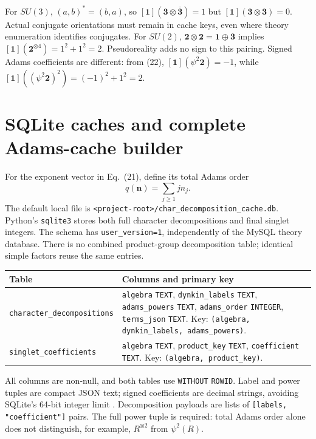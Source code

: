 \documentclass[11pt,a4paper]{article}
\newcommand{\code}[1]{{\small\nolinkurl{#1}}}
\begin{document}
For $SU(3)$, $(a,b)^*=(b,a)$, so
$[\mathbf1](\mathbf3\otimes\overline{\mathbf3})=1$ but
$[\mathbf1](\mathbf3\otimes\mathbf3)=0$. Actual conjugate orientations must remain
in cache keys, even where theory enumeration identifies conjugates.
For $SU(2)$, $\mathbf2\otimes\mathbf2=\mathbf1\oplus\mathbf3$ implies
$[\mathbf1](\mathbf2^{\otimes4})=1^2+1^2=2$. Pseudoreality adds no sign to this
pairing. Signed Adams coefficients are different: from (22),
$[\mathbf1](\psi^2\mathbf2)=-1$, while
$[\mathbf1]((\psi^2\mathbf2)^2)=(-1)^2+1^2=2$.

\clearpage


\clearpage
\section{SQLite caches and complete Adams-cache builder}\label{sec:cache}
For the exponent vector in Eq.~(21), define its total Adams order
\begin{equation}
 q(\mathbf n)=\sum_{j\geq1}j n_j.
\end{equation}
The default local file is \code{<project-root>/char_decomposition_cache.db}.
Python's \code{sqlite3} stores both full character decompositions and final
singlet integers. The schema has \code{user_version=1}, independently of the
MySQL theory database. There is no combined product-group decomposition table;
identical simple factors reuse the same entries.

\begin{tabularx}{\textwidth}{@{}p{50mm}Y@{}}
\toprule Table & Columns and primary key\\\midrule
\code{character_decompositions} & \code{algebra} \code{TEXT}, \code{dynkin_labels} \code{TEXT},
\code{adams_powers} \code{TEXT}, \code{adams_order} \code{INTEGER}, \code{terms_json} \code{TEXT}.
Key: \code{(algebra, dynkin_labels, adams_powers)}.\\[4pt]
\code{singlet_coefficients} & \code{algebra} \code{TEXT}, \code{product_key} \code{TEXT},
\code{coefficient} \code{TEXT}. Key: \code{(algebra, product_key)}.\\\bottomrule
\end{tabularx}
All columns are non-null, and both tables use \code{WITHOUT} \code{ROWID}. Label and
power tuples are compact JSON text; signed coefficients are decimal strings,
avoiding SQLite's 64-bit integer limit \cite{sqlite-types}. Decomposition payloads
are lists of \code{[labels, "coefficient"]} pairs. The full power tuple is required:
total Adams order alone does not distinguish, for example, $R^{\otimes2}$ from
$\psi^2(R)$.
\end{document}
